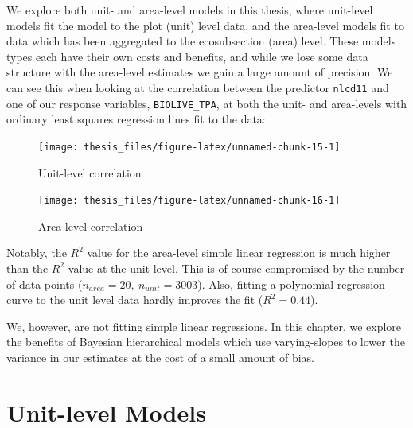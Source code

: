 \documentclass[12pt,twoside]{reedthesis}
\begin{document}
We explore both unit- and area-level models in this thesis, where unit-level models fit the model to the plot (unit) level data, and the area-level models fit to data which has been aggregated to the ecosubsection (area) level. These models types each have their own costs and benefits, and while we lose some data structure with the area-level estimates we gain a large amount of precision. We can see this when looking at the correlation between the predictor \texttt{nlcd11} and one of our response variables, \texttt{BIOLIVE\_TPA}, at both the unit- and area-levels with ordinary least squares regression lines fit to the data:
\begin{figure}

{\centering \texttt{[image: thesis\_files/figure-latex/unnamed-chunk-15-1]} 

}

\caption{Unit-level correlation}\label{fig:unnamed-chunk-15}
\end{figure}
\begin{figure}

{\centering \texttt{[image: thesis\_files/figure-latex/unnamed-chunk-16-1]} 

}

\caption{Area-level correlation}\label{fig:unnamed-chunk-16}
\end{figure}
Notably, the \(R^2\) value for the area-level simple linear regression is much higher than the \(R^2\) value at the unit-level. This is of course compromised by the number of data points (\(n_{area} = 20, ~ n_{unit} = 3003\)). Also, fitting a polynomial regression curve to the unit level data hardly improves the fit (\(R^2 = 0.44\)).

We, however, are not fitting simple linear regressions. In this chapter, we explore the benefits of Bayesian hierarchical models which use varying-slopes to lower the variance in our estimates at the cost of a small amount of bias.

\hypertarget{unit-level-models}{%
\section{Unit-level Models}\label{unit-level-models}}
\end{document}

